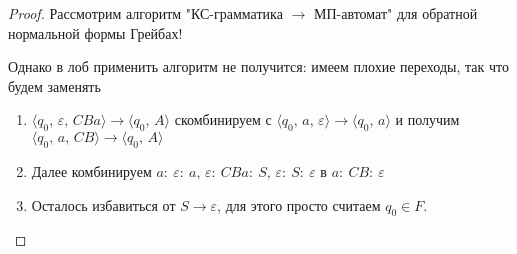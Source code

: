 \documentclass[a4paper,12pt]{article}
\theoremstyle{plain}
\theoremstyle{definition}
\theoremstyle{remark}
\begin{document}
\begin{proof}
	Рассмотрим алгоритм "КС-грамматика $\to$ МП-автомат" для обратной нормальной формы Грейбах!

	Однако в лоб применить алгоритм не получится: имеем плохие переходы, так что будем заменять
	\begin{enumerate}
		\item $\langle q_0,\,\varepsilon,\, CBa\rangle \to \langle q_0,\, A\rangle$ скомбинируем с $\langle q_0,\, a,\, \varepsilon\rangle\to\langle q_0,\,a\rangle$ и получим $\langle q_0,\, a,\,CB\rangle\to\langle q_0,\, A\rangle$
		\item Далее комбинируем $a:\:\varepsilon:\: a,\, \varepsilon :\: CBa:\: S,\, \varepsilon:\: S:\: \varepsilon$ в $a :\: CB :\: \varepsilon$
		\item Осталось избавиться от $S \to \varepsilon$, для этого просто считаем $q_0 \in F$.
	\end{enumerate}


\end{proof}
\end{document}
